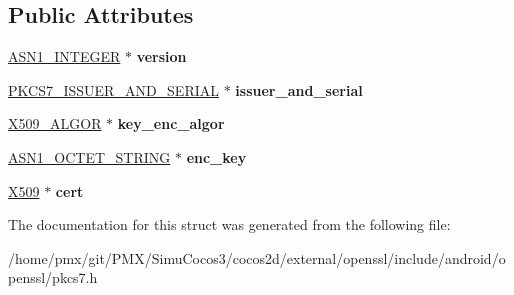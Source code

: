 \subsection*{Public Attributes}
\begin{DoxyCompactItemize}
\item 
\mbox{\label{structpkcs7__recip__info__st_adda35f0b9652ea93e4bcede27b352813}} 
\hyperlink{structasn1__string__st}{A\+S\+N1\+\_\+\+I\+N\+T\+E\+G\+ER} $\ast$ {\bfseries version}
\item 
\mbox{\label{structpkcs7__recip__info__st_aab23b3e3d5ff2a936facbffae1088877}} 
\hyperlink{structpkcs7__issuer__and__serial__st}{P\+K\+C\+S7\+\_\+\+I\+S\+S\+U\+E\+R\+\_\+\+A\+N\+D\+\_\+\+S\+E\+R\+I\+AL} $\ast$ {\bfseries issuer\+\_\+and\+\_\+serial}
\item 
\mbox{\label{structpkcs7__recip__info__st_a49e282bfa13b2349bae186903b83481a}} 
\hyperlink{structX509__algor__st}{X509\+\_\+\+A\+L\+G\+OR} $\ast$ {\bfseries key\+\_\+enc\+\_\+algor}
\item 
\mbox{\label{structpkcs7__recip__info__st_ab2c450e4a44471e648366294f26b41b7}} 
\hyperlink{structasn1__string__st}{A\+S\+N1\+\_\+\+O\+C\+T\+E\+T\+\_\+\+S\+T\+R\+I\+NG} $\ast$ {\bfseries enc\+\_\+key}
\item 
\mbox{\label{structpkcs7__recip__info__st_ac8f44726b98ae5108855c906a968a30a}} 
\hyperlink{structx509__st}{X509} $\ast$ {\bfseries cert}
\end{DoxyCompactItemize}


The documentation for this struct was generated from the following file\+:\begin{DoxyCompactItemize}
\item 
/home/pmx/git/\+P\+M\+X/\+Simu\+Cocos3/cocos2d/external/openssl/include/android/openssl/pkcs7.\+h\end{DoxyCompactItemize}
